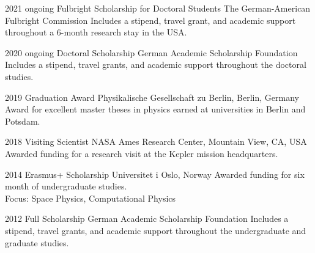\documentclass[]{k-cv} %
\begin{document}
\begin{entrylist}
\entry
{2021 \to ongoing}
{Fulbright Scholarship for Doctoral Students}
{The German-American Fulbright Commission }
{Includes a stipend, travel grant, and academic support throughout a 6-month research stay in the USA.}

\entry
{2020 \to ongoing}
{Doctoral Scholarship}
{German Academic Scholarship Foundation}
{Includes a stipend, travel grants, and academic support throughout the doctoral studies.}

\entry
{2019}
{Graduation Award}
{Physikalische Gesellschaft zu Berlin, Berlin, Germany}
{Award for excellent master theses in physics earned at universities in Berlin and Potsdam.}


\entry
{2018}
{Visiting Scientist}
{NASA Ames Research Center, Mountain View, CA, USA}
{Awarded funding for a research visit at the Kepler mission headquarters.}


\entry
{2014}
{Erasmus+ Scholarship}
{Universitet i Oslo, Norway}
{Awarded funding for six month of undergraduate studies.\\
Focus: Space Physics, Computational Physics}

\entry
{2012 }
{Full Scholarship}
{German Academic Scholarship Foundation}
{Includes a stipend, travel grants, and academic support throughout the undergraduate and graduate studies.}

\end{entrylist}





\end{document}
